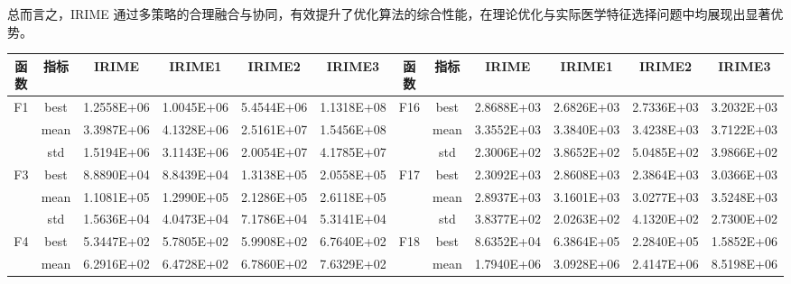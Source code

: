 \documentclass{wzuthesis}
\begin{document}
总而言之，IRIME 通过多策略的合理融合与协同，有效提升了优化算法的综合性能，在理论优化与实际医学特征选择问题中均展现出显著优势。

\begin{table}[htbp]
  \centering
  \footnotesize
    \setlength{\tabcolsep}{3pt} %
    \begin{tabular}{rrrrrrccrrrr}
	\toprule
    \multicolumn{1}{c}{函数} & \multicolumn{1}{c}{指标} & \multicolumn{1}{c}{IRIME} & \multicolumn{1}{c}{IRIME1} & \multicolumn{1}{c}{IRIME2} & \multicolumn{1}{c}{IRIME3} & 函数 & 指标 & \multicolumn{1}{c}{IRIME} & \multicolumn{1}{c}{IRIME1} & \multicolumn{1}{c}{IRIME2} & \multicolumn{1}{c}{IRIME3} \\
	\midrule
    \multicolumn{1}{c}{\multirow{3}[0]{*}{F1}} & \multicolumn{1}{c}{best} & 1.2558E+06 & 1.0045E+06 & 5.4544E+06 & 1.1318E+08 & \multirow{3}[0]{*}{F16} & best  & 2.8688E+03 & 2.6826E+03 & 2.7336E+03 & 3.2032E+03 \\
          & \multicolumn{1}{c}{mean} & 3.3987E+06 & 4.1328E+06 & 2.5161E+07 & 1.5456E+08 &       & mean  & 3.3552E+03 & 3.3840E+03 & 3.4238E+03 & 3.7122E+03 \\
          & \multicolumn{1}{c}{std} & 1.5194E+06 & 3.1143E+06 & 2.0054E+07 & 4.1785E+07 &       & std   & 2.3006E+02 & 3.8652E+02 & 5.0485E+02 & 3.9866E+02 \\
    \multicolumn{1}{c}{\multirow{3}[0]{*}{F3}} & \multicolumn{1}{c}{best} & 8.8890E+04 & 8.8439E+04 & 1.3138E+05 & 2.0558E+05 & \multirow{3}[0]{*}{F17} & best  & 2.3092E+03 & 2.8608E+03 & 2.3864E+03 & 3.0366E+03 \\
          & \multicolumn{1}{c}{mean} & 1.1081E+05 & 1.2990E+05 & 2.1286E+05 & 2.6118E+05 &       & mean  & 2.8937E+03 & 3.1601E+03 & 3.0277E+03 & 3.5248E+03 \\
          & \multicolumn{1}{c}{std} & 1.5636E+04 & 4.0473E+04 & 7.1786E+04 & 5.3141E+04 &       & std   & 3.8377E+02 & 2.0263E+02 & 4.1320E+02 & 2.7300E+02 \\
    \multicolumn{1}{c}{\multirow{3}[0]{*}{F4}} & \multicolumn{1}{c}{best} & 5.3447E+02 & 5.7805E+02 & 5.9908E+02 & 6.7640E+02 & \multirow{3}[0]{*}{F18} & best  & 8.6352E+04 & 6.3864E+05 & 2.2840E+05 & 1.5852E+06 \\
          & \multicolumn{1}{c}{mean} & 6.2916E+02 & 6.4728E+02 & 6.7860E+02 & 7.6329E+02 &       & mean  & 1.7940E+06 & 3.0928E+06 & 2.4147E+06 & 8.5198E+06 \\

\end{tabular}
\end{table}
\end{document}
